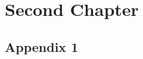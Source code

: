 \documentclass{sinai}
\begin{document}
\lipsum[1-3]

\chapter{Second Chapter}

\begin{appendices}
\chapter{Appendix 1}

\lipsum[1]

\end{appendices}

\backmatter
\singlespacing
\printbibliography
\end{document}
